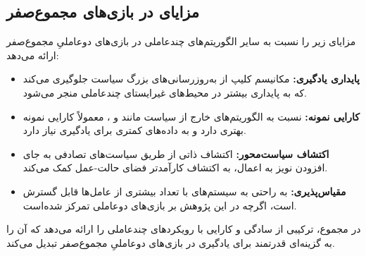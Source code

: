 \subsection{مزایای  در بازی‌های مجموع­‌صفر}

 مزایای زیر را نسبت به سایر الگوریتم‌های چند­عاملی در بازی‌های دو­عاملیِ مجموع­‌صفر ارائه می‌دهد:

\begin{itemize}
    \item \textbf{پایداری یادگیری:} مکانیسم کلیپ  از به‌روزرسانی‌های بزرگ سیاست جلوگیری می‌کند که به پایداری بیشتر در محیط‌های غیرایستای چند­عاملی منجر می‌شود.
    \item \textbf{کارایی نمونه:} نسبت به الگوریتم‌های خارج از سیاست مانند  و ،  معمولاً کارایی نمونه بهتری دارد و به داده‌های کمتری برای یادگیری نیاز دارد.
    \item \textbf{اکتشاف سیاست‌محور:} اکتشاف ذاتی از طریق سیاست‌های تصادفی به جای افزودن نویز به اعمال، به اکتشاف کارآمدتر فضای حالت-عمل کمک می‌کند.
    \item \textbf{مقیاس‌پذیری:}  به راحتی به سیستم‌های با تعداد بیشتری از عامل‌ها قابل گسترش است، اگرچه در این پژوهش بر بازی‌های دو­عاملی تمرکز شده‌است.
\end{itemize}

در مجموع،  ترکیبی از سادگی و کارایی  با رویکردهای چند­عاملی را ارائه می‌دهد که آن را به گزینه‌ای قدرتمند برای یادگیری در بازی‌های دو­عاملیِ مجموع­‌صفر تبدیل می‌کند.
